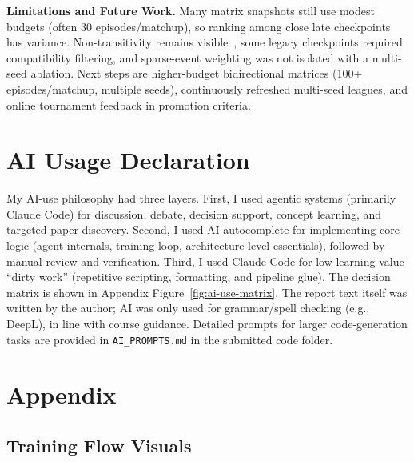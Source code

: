 \documentclass[11pt]{article}
\begin{document}
\textbf{Limitations and Future Work.} Many matrix snapshots still use modest budgets (often 30 episodes/matchup), so ranking among close late checkpoints has variance. Non-transitivity remains visible~\cite{minimaxexploiter2023,robustleague2023}, some legacy checkpoints required compatibility filtering, and sparse-event weighting was not isolated with a multi-seed ablation. Next steps are higher-budget bidirectional matrices (100+ episodes/matchup, multiple seeds), continuously refreshed multi-seed leagues, and online tournament feedback in promotion criteria.

\section{AI Usage Declaration}\label{sec:ai-usage}

My AI-use philosophy had three layers. First, I used agentic systems (primarily Claude Code) for discussion, debate, decision support, concept learning, and targeted paper discovery. Second, I used AI autocomplete for implementing core logic (agent internals, training loop, architecture-level essentials), followed by manual review and verification. Third, I used Claude Code for low-learning-value ``dirty work'' (repetitive scripting, formatting, and pipeline glue). The decision matrix is shown in Appendix Figure~\ref{fig:ai-use-matrix}.
The report text itself was written by the author; AI was only used for grammar/spell checking (e.g., DeepL), in line with course guidance.
Detailed prompts for larger code-generation tasks are provided in \texttt{AI\_PROMPTS.md} in the submitted code folder.

\clearpage



\clearpage
\appendix
\section{Appendix}
\subsection{Training Flow Visuals}
\end{document}
